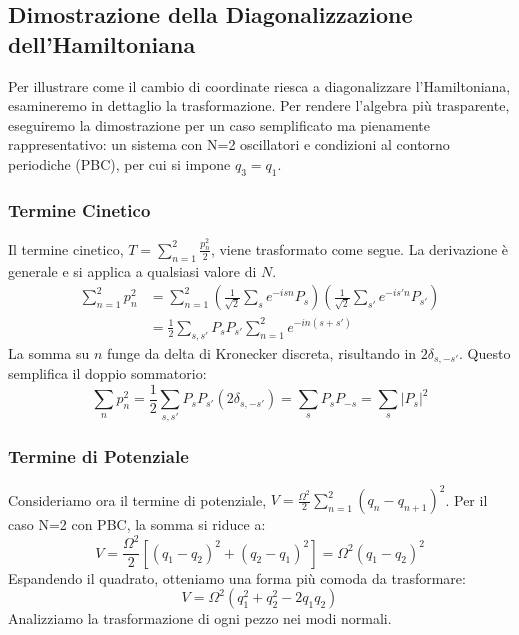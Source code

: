 
\subsection{Dimostrazione della Diagonalizzazione dell'Hamiltoniana}

Per illustrare come il cambio di coordinate riesca a diagonalizzare l'Hamiltoniana, esamineremo in dettaglio la trasformazione. Per rendere l'algebra più trasparente, eseguiremo la dimostrazione per un caso semplificato ma pienamente rappresentativo: un sistema con N=2 oscillatori  e condizioni al contorno periodiche (PBC), per cui si impone $q_3=q_1$.

\subsubsection{Termine Cinetico}
Il termine cinetico, $T = \sum_{n=1}^2 \frac{p_n^2}{2}$, viene trasformato come segue. La derivazione è generale e si applica a qualsiasi valore di $N$.
\begin{align*}
    \sum_{n=1}^2 p_n^2 &= \sum_{n=1}^2 \left( \frac{1}{\sqrt{2}} \sum_s e^{-isn} P_s \right) \left( \frac{1}{\sqrt{2}} \sum_{s'} e^{-is'n} P_{s'} \right) \\
    &= \frac{1}{2} \sum_{s,s'} P_s P_{s'} \sum_{n=1}^2 e^{-in(s+s')}
\end{align*}
La somma su $n$ funge da delta di Kronecker discreta, risultando in $2\delta_{s,-s'}$. Questo semplifica il doppio sommatorio:
\begin{equation*}
    \sum_n p_n^2 = \frac{1}{2} \sum_{s,s'} P_s P_{s'} (2\delta_{s,-s'}) = \sum_s P_s P_{-s} = \sum_s |P_s|^2
\end{equation*}

\subsubsection{Termine di Potenziale}
Consideriamo ora il termine di potenziale, $V = \frac{\Omega^2}{2} \sum_{n=1}^2 (q_n - q_{n+1})^2$. Per il caso N=2 con PBC, la somma si riduce a:
\begin{equation*}
    V = \frac{\Omega^2}{2} \left[ (q_1 - q_2)^2 + (q_2 - q_1)^2 \right] = \Omega^2(q_1-q_2)^2
\end{equation*}
Espandendo il quadrato, otteniamo una forma più comoda da trasformare:
\begin{equation*}
    V = \Omega^2(q_1^2 + q_2^2 - 2q_1q_2)
\end{equation*}
Analizziamo la trasformazione di ogni pezzo nei modi normali.

